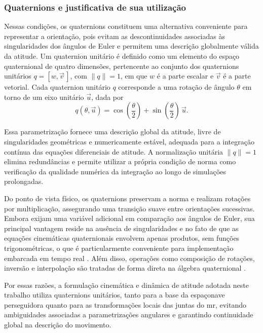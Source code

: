 \subsubsection{Quaternions e justificativa de sua utilização}
\label{sec:representacao_quaternion}
 
Nessas condições, os quaternions constituem uma alternativa conveniente para representar a orientação, pois evitam as descontinuidades associadas às singularidades dos ângulos de Euler e permitem uma descrição globalmente válida da atitude. Um quaternion unitário é definido como um elemento do espaço quaternional de quatro dimensões, pertencente ao conjunto
dos quaternions unitários $q = [w,\vec{v}\,]$, com $\|q\| = 1$, em que $w$ é a parte escalar e $\vec{v}$ é a parte vetorial. Cada quaternion unitário $q$ corresponde a uma rotação de ângulo $\theta$ em torno de um eixo unitário $\vec{u}$, dada por
\begin{equation}
q(\theta,\vec{u}) = \cos\!\left(\frac{\theta}{2}\right) + \sin\!\left(\frac{\theta}{2}\right)\,\vec{u}.
\label{eq:quat_axis_angle}
\end{equation}

Essa parametrização fornece uma descrição global da atitude, livre de singularidades geométricas e numericamente estável, adequada para a integração contínua das equações diferenciais de atitude. A normalização unitária $\|q\|=1$ elimina redundâncias e permite utilizar a própria condição de norma como verificação da qualidade numérica da integração ao longo de simulações prolongadas.

Do ponto de vista físico, os quaternions preservam a norma e realizam rotações por multiplicação, assegurando uma transição suave entre orientações sucessivas. Embora exijam uma variável adicional em comparação aos ângulos de Euler, sua principal vantagem reside na ausência de singularidades e no fato de que as equações cinemáticas quaternionais envolvem apenas produtos, sem funções trigonométricas, o que é particularmente conveniente para implementação embarcada em tempo real \cite{wie2008space}. Além disso, operações como composição de rotações, inversão e interpolação são tratadas de forma direta na álgebra quaternional \cite{gonzalez2025quaternionic}.

Por essas razões, a formulação cinemática e dinâmica de atitude adotada neste trabalho utiliza quaternions unitários, tanto para a base da espaçonave perseguidora quanto para as transformações locais das juntas do \gls{mr}, evitando ambiguidades associadas a parametrizações angulares e garantindo continuidade global na descrição do movimento.

